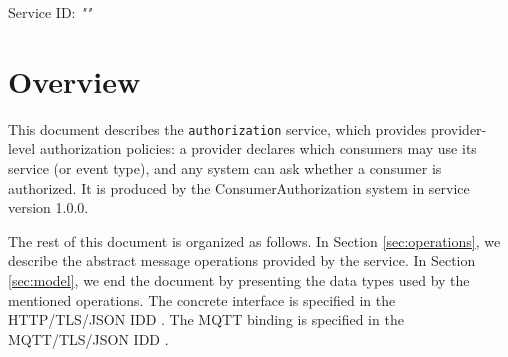 \documentclass[a4paper]{arrowhead}
\begin{document}
\sloppy

\ArrowheadSetup

\begin{center}
  \vspace*{1cm}
  \huge{\arrowtitle}

  \vspace*{0.2cm}
  \LARGE{\arrowtype}
  \vspace*{1cm}

  \Large{Service ID: \textit{"\arrowid"}}

  \vspace*{\fill}


  \vspace*{1cm}
  \vspace*{\fill}

  \begin{abstract}
    This document describes the \texttt{authorization} service, version 1.0.0, produced by the ConsumerAuthorization core system of Arrowhead 5.2.2.
  \end{abstract}

  \vspace*{1cm}
\end{center}

\newpage

\tableofcontents
\newpage

\section{Overview}
\label{sec:overview}

This document describes the \texttt{authorization} service, which provides provider-level authorization policies: a provider declares which consumers may use its service (or event type), and any system can ask whether a consumer is authorized.
It is produced by the ConsumerAuthorization system \cite{ca-sysd} in service version 1.0.0.

The rest of this document is organized as follows.
In Section \ref{sec:operations}, we describe the abstract message operations provided by the service.
In Section \ref{sec:model}, we end the document by presenting the data types used by the mentioned operations.
The concrete interface is specified in the HTTP/TLS/JSON IDD \cite{ca-authorization-http-idd}. The MQTT binding is specified in the MQTT/TLS/JSON IDD \cite{ca-authorization-mqtt-idd}.
\end{document}
